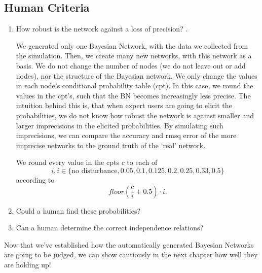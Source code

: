 \subsection{Human Criteria}
\begin{enumerate}


\item How robust is the network against a loss of precision? \citep{Druzdzel2013}.

We generated only one Bayesian Network, with the data we collected from the simulation. Then, we create many new networks, with this network as a basis. We do not change the number of nodes (we do not leave out or add nodes), nor the structure of the Bayesian network. We only change the values in each node's conditional probability table (cpt). In this case, we round the values in the cpt's, such that the BN becomes increasingly less precise. The intuition behind this is, that when expert users are going to elicit the probabilities, we do not know how robust the network is against smaller and larger imprecisions in the elicited probabilities. By simulating such imprecisions, we can compare the accuracy and rmsq error of the more imprecise networks to the ground truth of the `real' network. 

We round every value in the cpts $c$ to each of \[i, i \in \{\text{no disturbance}, 0.05, 0.1, 0.125, 0.2, 0.25, 0.33, 0.5\} \] according to \[ floor(\frac{c}{i} + 0.5) \cdot i.\]

\item Could a human find these probabilities?

\item Can a human determine the correct independence relations?

\end{enumerate}

Now that we've established how the automatically generated Bayesian Networks are going to be judged, we can show cautiously in the next chapter how well they are holding up!


